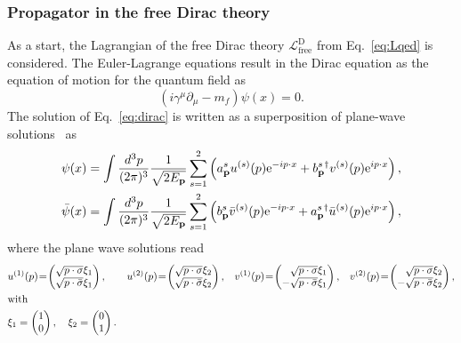 \subsubsection*{Propagator in the free Dirac theory}
As a start, the Lagrangian of the free Dirac theory $\mathcal{L}_{\text{free}}^{\text{D}}$ from Eq.~\eqref{eq:Lqed} is considered. The Euler-Lagrange equations result in the Dirac equation as the equation of motion for the quantum field as
\begin{equation}
\label{eq:dirac}
\left( i\gamma^\mu \partial_\mu -m_f \right) \psi(x) = 0.
\end{equation}
The solution of Eq.~\eqref{eq:dirac} is written as a superposition of plane-wave solutions~\mbox{\cite[Sec.~3.3.]{peskin1995}} as
\begin{alignat}{2}
& \psi(x) = 
\int \frac{\mathrm{}d^3p}{(2\pi)^3}\frac{1}{\sqrt{2E_\mathbf{p}}} 
\sum_{s=1}^{2} \left(a^s_\mathbf{p}u^{(s)}(p) \text{e}^{-ip\cdot x} + b^{s\,\dagger}_{\mathbf{p}}v^{(s)}(p) \text{e}^{ip\cdot x} \right),\\
& \bar{\psi}(x) = 
\int \frac{\mathrm{}d^3p}{(2\pi)^3}\frac{1}{\sqrt{2E_\mathbf{p}}} 
\sum_{s=1}^{2} \left(b^s_\mathbf{p}\bar{v}^{(s)}(p) \text{e}^{-ip\cdot x} + a^{s\,\dagger}_{\mathbf{p}}\bar{u}^{(s)}(p) \text{e}^{ip\cdot x} \right),\\
\end{alignat}
where the plane wave solutions read
\begin{alignat}{4}
& u^{(1)}(p)\hspace{-2pt}=\hspace{-2pt} \begin{pmatrix}\sqrt{p\cdot \sigma}\xi_1\\\sqrt{p\cdot \bar{\sigma}}\xi_1\end{pmatrix},&& 
u^{(2)}(p)\hspace{-2pt}=\hspace{-2pt} \begin{pmatrix}\sqrt{p\cdot \sigma}\xi_2\\\sqrt{p\cdot \bar{\sigma}}\xi_2\end{pmatrix},&& 
v^{(1)}(p)\hspace{-2pt}=\hspace{-2pt} \begin{pmatrix}\phantom{-}\sqrt{p\cdot \sigma}\xi_1\\-\sqrt{p\cdot \bar{\sigma}}\xi_1\end{pmatrix},&& 
v^{(2)}(p)\hspace{-2pt}=\hspace{-2pt} \begin{pmatrix}\phantom{-}\sqrt{p\cdot \sigma}\xi_2\\-\sqrt{p\cdot \bar{\sigma}}\xi_2\end{pmatrix},\notag\\
&\text{with}\\
&\xi_1=\begin{pmatrix}1\\0\end{pmatrix},\quad
\xi_2=\begin{pmatrix}0\\1\end{pmatrix}.\notag
\end{alignat}
